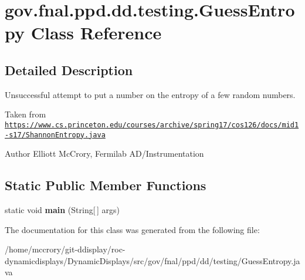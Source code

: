 \hypertarget{classgov_1_1fnal_1_1ppd_1_1dd_1_1testing_1_1GuessEntropy}{\section{gov.\-fnal.\-ppd.\-dd.\-testing.\-Guess\-Entropy Class Reference}
\label{classgov_1_1fnal_1_1ppd_1_1dd_1_1testing_1_1GuessEntropy}
}


\subsection{Detailed Description}
Unsuccessful attempt to put a number on the entropy of a few random numbers.

Taken from \href{https://www.cs.princeton.edu/courses/archive/spring17/cos126/docs/mid1-s17/ShannonEntropy.java}{\tt https\-://www.\-cs.\-princeton.\-edu/courses/archive/spring17/cos126/docs/mid1-\/s17/\-Shannon\-Entropy.\-java}

\begin{DoxyAuthor}{Author}
Elliott Mc\-Crory, Fermilab A\-D/\-Instrumentation 
\end{DoxyAuthor}
\subsection*{Static Public Member Functions}
\begin{DoxyCompactItemize}
\item 
\hypertarget{classgov_1_1fnal_1_1ppd_1_1dd_1_1testing_1_1GuessEntropy_abd0c584cec5ee4338bb4a43283361194}{static void {\bfseries main} (String\mbox{[}$\,$\mbox{]} args)}\label{classgov_1_1fnal_1_1ppd_1_1dd_1_1testing_1_1GuessEntropy_abd0c584cec5ee4338bb4a43283361194}

\end{DoxyCompactItemize}


The documentation for this class was generated from the following file\-:\begin{DoxyCompactItemize}
\item 
/home/mccrory/git-\/ddisplay/roc-\/dynamicdisplays/\-Dynamic\-Displays/src/gov/fnal/ppd/dd/testing/Guess\-Entropy.\-java\end{DoxyCompactItemize}
